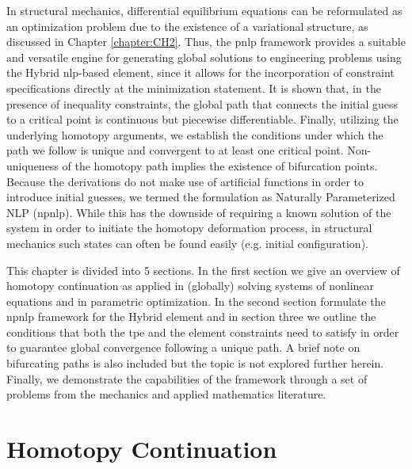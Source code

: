 In structural mechanics, differential equilibrium equations can be reformulated 
as an optimization problem due to the existence of a variational structure, as 
discussed in Chapter \ref{chapter:CH2}. Thus, the \acrshort{pnlp} framework 
provides a suitable and versatile engine for generating global solutions to 
engineering problems using the Hybrid 
\acrshort{nlp}-based element, since it allows for the incorporation of 
constraint
specifications directly at the minimization statement. It is shown that, in the 
presence of inequality constraints, the global path that connects the initial 
guess to a critical point is continuous but piecewise 
differentiable\cite{Kojima:1984,Guddat:1990,Gfrerer:1985}. Finally, utilizing 
the underlying 
homotopy arguments, we establish the conditions under which the path we follow 
is unique and convergent to at least one critical point. Non-uniqueness of the 
homotopy path implies the existence of bifurcation points. Because the 
derivations do not make use of artificial functions in order to introduce 
initial guesses, we termed the formulation as Naturally Parameterized NLP 
(\acrshort{npnlp}). While this has the downside of requiring a known solution 
of the system in order to initiate the homotopy deformation process, in 
structural mechanics such states can often be found easily (e.g. initial 
configuration).

This chapter is divided into 5 sections. In the first section we give an 
overview of homotopy continuation as applied in (globally) solving systems of 
nonlinear equations and in parametric optimization. In the second section 
formulate the \acrshort{npnlp} framework for the Hybrid element and in section 
three we outline the conditions that both the \acrshort{tpe} and the element 
constraints need to satisfy in order to guarantee global convergence following 
a unique path. A brief note on bifurcating paths is also included but the topic 
is not explored further herein. Finally, we demonstrate the capabilities of the 
framework through a set of problems from the 
mechanics and applied mathematics literature.

\section{Homotopy Continuation}\label{CH4-S1}

